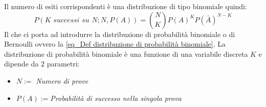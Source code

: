 \documentclass[11pt,a4paper]{book}
\begin{document}
Il numero di esiti corrispondenti è una distribuzione di tipo binomiale quindi:
\begin{equation}
P(\textit{K successi su N};N,P(A)) = \binom{N}{K}P(A)^K P(\bar{A})^{N-K} \label{eq_Def distribuzione di probabilità binomiale}
\end{equation}
Il che ci porta ad introdurre la distribuzione di probabilità binomiale o di Bernoulli ovvero la \eqref{eq_Def distribuzione di probabilità binomiale}.
La distribuzione di probabilità binomiale è una funzione di una variabile discreta $ K $ e dipende da $ 2 $ parametri: 
\begin{itemize}
\item $ N :=$ \textit{Numero di prove}
\item $ P(A):= $\textit{Probabilità di successo nella singola prova}
\end{itemize}
\end{document}
